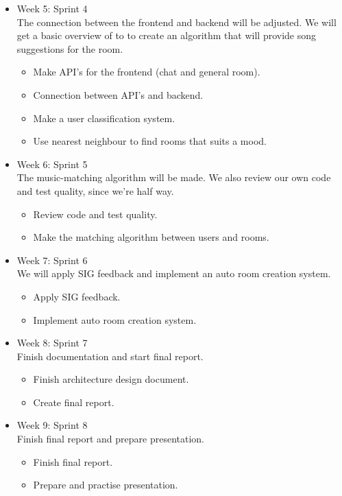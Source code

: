 \begin{itemize}
\item Week 5: Sprint 4\\
The connection between the frontend and backend will be adjusted. We will get a basic overview of to to create an algorithm that will provide song suggestions for the room.

\begin{itemize}
\item Make API's for the frontend (chat and general room).
\item Connection between API's and backend.
\item Make a user classification system.
\item Use nearest neighbour to find rooms that suits a mood.
\end{itemize}

\item Week 6: Sprint 5\\
The music-matching algorithm will be made. We also review our own code and test quality, since we're half way.

\begin{itemize}
\item Review code and test quality.
\item Make the matching algorithm between users and rooms.
\end{itemize}

\item Week 7: Sprint 6\\
We will apply \gls{SIG} feedback and implement an auto room creation system.

\begin{itemize}
\item Apply \gls{SIG} feedback.
\item Implement auto room creation system.
\end{itemize}

\item Week 8: Sprint 7\\
Finish documentation and start final report.

\begin{itemize}
\item Finish architecture design document.
\item Create final report.
\end{itemize}


\item Week 9: Sprint 8\\
Finish final report and prepare presentation.

\begin{itemize}
\item Finish final report.
\item Prepare and practise presentation.
\end{itemize}


\end{itemize}

